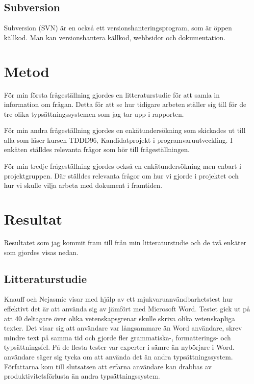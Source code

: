 \subsection{Subversion}
Subversion (SVN) är en också ett versionshanteringsprogram, som är öppen källkod. Man kan versionshantera källkod, webbsidor och dokumentation. 

\section{Metod}
\label{sec:method-tuhkala}

För min första frågeställning gjordes en litteraturstudie för att samla in information om frågan. Detta för att se hur tidigare arbeten ställer sig till för de tre olika typsättningssystemen som jag tar upp i rapporten.

För min andra frågeställning gjordes en enkätundersökning som skickades ut till alla som läser kursen TDDD96, Kandidatprojekt i programvaruutveckling. I enkäten ställdes relevanta frågor som hör till frågeställningen.

För min tredje frågeställning gjordes också en enkätundersökning men enbart i projektgruppen. Där ställdes relevanta frågor om hur vi gjorde i projektet och hur vi skulle vilja arbeta med dokument i framtiden.

\section{Resultat}
\label{sec:results-tuhkala}
Resultatet som jag kommit fram till från min litteraturstudie och de två enkäter som gjordes visas nedan.

\subsection{Litteraturstudie}
Knauff och Nejasmic \cite{knauff2014efficiency} visar med hjälp av ett mjukvaruanvändbarhetstest hur effektivt det är att använda sig av \latex jämfört med Microsoft Word. Testet gick ut på att 40 deltagare över olika vetenskapsgrenar skulle skriva olika vetenskapliga texter.
Det visar sig att \latex användare var långsammare än Word användare, skrev mindre text på samma tid och gjorde fler grammatiska-, formatterings- och typsättningsfel. På de flesta tester var experter i \latex sämre än nybörjare i Word. \latex användare säger sig tycka om att använda det än andra typsättningssystem. Författarna kom till slutsatsen att erfarna \latex användare kan drabbas av produktivitetsförlusta än andra typsättningssystem.



